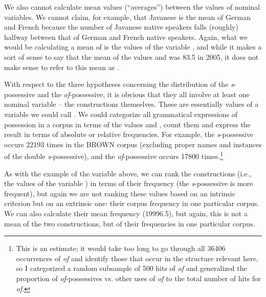 We also cannot calculate mean  values (``averages'') between the values of nominal  variables. We cannot claim, for example, that Javanese is the mean of German and French because the number of Javanese native speakers falls (roughly) halfway between that of German and French native speakers. Again, what we would be calculating a mean of is the values of the variable , and while it makes a sort of sense to say that the mean  of the values  and  was 83.5 in 2005, it does not make sense to refer to this mean as .


With respect to the three hypotheses  concerning the distribution  of the \textit{s}-possessive  and the \textit{of}-possessive, it is obvious that they all involve at least one nominal  variable -- the constructions themselves. These are essentially values of a variable we could call . We could categorize  all grammatical expressions of possession in a corpus in terms of the values  and , count them and express the result in terms of absolute or relative frequencies.  For example, the \textit{s}-possessive occurs \num{22193} times in the BROWN  corpus (excluding proper names and instances of the double \textit{s}-possessive), and the \textit{of}-possessive occurs \num{17800} times.\footnote{This is an estimate; it would take too long to go through all \num{36406} occurrences of \textit{of} and identify those that occur in the structure relevant here, so I categorized a random  subsample of 500 hits of \textit{of} and generalized the proportion of \textit{of}-possessives  vs. other uses of \textit{of} to the total number of hits for \textit{of}.}

As with the example of the variable  above, we can rank the constructions (i.e., the values of the variable ) in terms of their frequency  (the \textit{s}-possessive is more frequent), but again we are not ranking these values based on an intrinsic criterion but on an extrinsic one: their corpus frequency in one particular corpus. We can also calculate their mean  frequency  (\num{19996.5}), but again, this is not a mean of the two constructions, but of their frequencies in one particular corpus.

